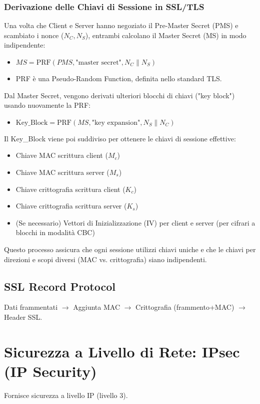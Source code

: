 \subsubsection{Derivazione delle Chiavi di Sessione in SSL/TLS}
\label{ssubsec:ssl_key_derivation}
Una volta che Client e Server hanno negoziato il Pre-Master Secret (PMS) e scambiato i nonce ($N_C, N_S$), entrambi calcolano il Master Secret (MS) in modo indipendente:
\begin{itemize}
    \item $MS = \text{PRF}(PMS, \text{"master secret"}, N_C \mathbin{\|} N_S)$
    \item PRF è una Pseudo-Random Function, definita nello standard TLS.
\end{itemize}
Dal Master Secret, vengono derivati ulteriori blocchi di chiavi ("key block") usando nuovamente la PRF:
\begin{itemize}
    \item $\text{Key\_Block} = \text{PRF}(MS, \text{"key expansion"}, N_S \mathbin{\|} N_C)$
\end{itemize}
Il Key\_Block viene poi suddiviso per ottenere le chiavi di sessione effettive:
\begin{itemize}
    \item Chiave MAC scrittura client ($M_c$)
    \item Chiave MAC scrittura server ($M_s$)
    \item Chiave crittografia scrittura client ($K_c$)
    \item Chiave crittografia scrittura server ($K_s$)
    \item (Se necessario) Vettori di Inizializzazione (IV) per client e server (per cifrari a blocchi in modalità CBC)
\end{itemize}
Questo processo assicura che ogni sessione utilizzi chiavi uniche e che le chiavi per direzioni e scopi diversi (MAC vs. crittografia) siano indipendenti.

\subsection{SSL Record Protocol}
Dati frammentati $\rightarrow$ Aggiunta MAC $\rightarrow$ Crittografia (frammento+MAC) $\rightarrow$ Header SSL.

\section{Sicurezza a Livello di Rete: IPsec (IP Security)}
\label{sec:ipsec}
Fornisce sicurezza a livello IP (livello 3).

